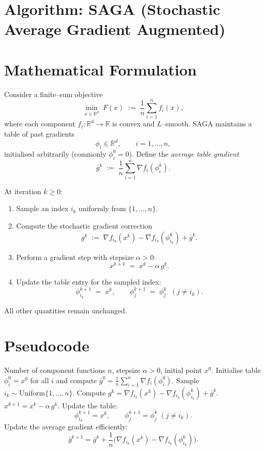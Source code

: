 \documentclass{article}
\newcommand{\grad}{\nabla}
\begin{document}
\section*{Algorithm: SAGA (Stochastic Average Gradient Augmented)}

\section*{Mathematical Formulation}
Consider a finite–sum objective
\[
\min_{x\in\mathbb{R}^d} \; F(x)\;:=\;\frac1n\sum_{i=1}^{n} f_i(x),
\]
where each component $f_i:\mathbb{R}^d\rightarrow\mathbb{R}$ is convex and $L$–smooth.
SAGA maintains a table of past gradients 
\[
\phi_i\in\mathbb{R}^d,\qquad i=1,\dots,n,
\]
initialised arbitrarily (commonly $\phi_i^{0}=0$).  
Define the \emph{average table gradient}
\[
\bar{g}^{k}\;:=\;\frac1n\sum_{i=1}^{n}\grad f_i(\phi_i^{k}).
\]

At iteration $k\ge 0$:
\begin{enumerate}
\item Sample an index $i_k$ uniformly from $\{1,\dots,n\}$.
\item Compute the stochastic gradient correction
\[
g^{k}\;:=\;\grad f_{i_k}(x^{k})-\grad f_{i_k}(\phi_{i_k}^{k})+\bar{g}^{k}.
\tag{1}
\]
\item Perform a gradient step with stepsize $\alpha>0$:
\[
x^{k+1}\;=\;x^{k}-\alpha\, g^{k}.
\tag{2}
\]
\item Update the table entry for the sampled index:
\[
\phi_{i_k}^{k+1}\;=\;x^{k},\qquad 
\phi_{j}^{k+1}\;=\;\phi_{j}^{k}\;\;(j\neq i_k).
\tag{3}
\]
\end{enumerate}
All other quantities remain unchanged.

\section*{Pseudocode}
\begin{algorithm}[H]
\caption{SAGA}
\begin{algorithmic}[1]
\Require Number of component functions $n$, stepsize $\alpha>0$, initial point $x^{0}$.
\State Initialise table $\phi_i^{0}=x^{0}$ for all $i$ and compute $\bar g^{0}= \frac1n\sum_{i=1}^{n}\grad f_i(\phi_i^{0})$.
    \State Sample $i_k\sim \text{Uniform}\{1,\dots,n\}$.
    \State Compute $g^{k}= \grad f_{i_k}(x^{k})-\grad f_{i_k}(\phi_{i_k}^{k})+\bar g^{k}$.
    \State $x^{k+1}=x^{k}-\alpha\, g^{k}$.
    \State Update the table:
    \[
    \phi_{i_k}^{k+1}=x^{k},\qquad 
    \phi_{j}^{k+1}= \phi_{j}^{k}\;(j\neq i_k).
    \]
    \State Update the average gradient efficiently:
    \[
    \bar g^{k+1}= \bar g^{k}+ \frac{1}{n}\bigl(\grad f_{i_k}(x^{k})-\grad f_{i_k}(\phi_{i_k}^{k})\bigr).
    \]
\EndFor
\end{algorithmic}
\end{algorithm}
\end{document}

